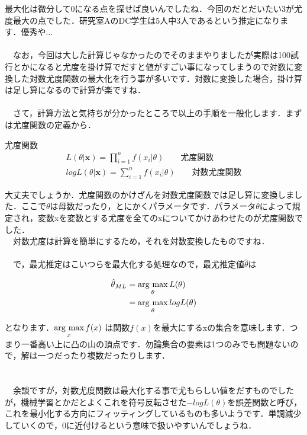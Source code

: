\documentclass[11pt,a4paper,uplatex]{ujreport} 	%
\newcommand{\argmax}{\mathop{\rm arg~max}\limits}
\begin{document}
最大化は微分して0になる点を探せば良いんでしたね．今回のだとだいたい3が尤度最大の点でした．研究室AのDC学生は5人中3人であるという推定になります．優秀や...\\
\\
　なお，今回は大した計算じゃなかったのでそのままやりましたが実際は100試行とかになると尤度を掛け算でだすと値がすごい事になってしまうので対数に変換した対数尤度関数の最大化を行う事が多いです．対数に変換した場合，掛け算は足し算になるので計算が楽ですね．\\
\\
　さて，計算方法と気持ちが分かったところで以上の手順を一般化します．まずは尤度関数の定義から．

\begin{screen}
尤度関数
\begin{align}
L(\theta|\mathbf{x}) = \prod_{i=1} ^n f(x_i|\theta) \qquad \text{尤度関数}\\
logL(\theta|\mathbf{x}) = \sum_{i=1}^n f(x_i|\theta) \qquad \text{対数尤度関数}
\end{align}
\end{screen}

大丈夫でしょうか．尤度関数のかけざんを対数尤度関数では足し算に変換しました．ここで$\theta$は母数だったり，とにかくパラメータです．パラメータ$\theta$によって規定され，変数xを変数とする尤度を全てのxについてかけあわせたのが尤度関数でした．\\
　対数尤度は計算を簡単にするため，それを対数変換したものですね．\\
\\
　で，最尤推定はこいつらを最大化する処理なので，最尤推定値$\hat\theta$は


\begin{align}
\label{eq:ML2}
\hat\theta_{ML} &= \argmax_\theta L(\theta) \\
&= \argmax_\theta logL(\theta)
\end{align}

となります．$\argmax_x f(x)$ は関数$f(x)$を最大にするxの集合を意味します．つまり一番高い上に凸の山の頂点です．勿論集合の要素は1つのみでも問題ないので，解は一つだったり複数だったりします．\\
\\
\\
　余談ですが，対数尤度関数は最大化する事で尤もらしい値をだすものでしたが，機械学習とかだとよくこれを符号反転させた$-logL(\theta)$を誤差関数と呼び，これを最小化する方向にフィッティングしているものも多いようです．単調減少していくので，0に近付けるという意味で扱いやすいんでしょうね．
\end{document}
